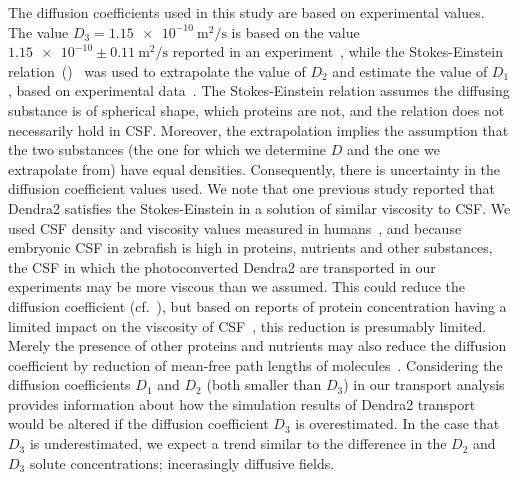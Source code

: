 \documentclass{WileyMSP-template}
\begin{document}
The diffusion coefficients used in this study are based on experimental values. 
The value $D_3=\num{1.15e-10} \ \mathrm{m^2/s}$
is based on the value $\num{1.15e-10} \pm 0.11 \ \mathrm{m^2/s}$ reported in an
experiment~\cite{GuraSadovsky2017MeasurementExpansion}, while the Stokes-Einstein
relation~()~\cite{Einstein1905UberTeilchen} was used to extrapolate
the value of $D_2$ and estimate the value of $D_1$, based on experimental
data~\cite{Swaminathan1997PhotobleachingDiffusion, Potma2001ReducedCells,
Mahmood2023ExosomeTemperature}. The Stokes-Einstein relation assumes the diffusing
substance is of spherical shape, which proteins are not, and the relation does not
necessarily hold in CSF. Moreover, the extrapolation implies the assumption that
the two substances (the one for which we determine $D$ and the one we extrapolate from)
have equal densities. Consequently, there is uncertainty in the diffusion coefficient values used.
We note that one previous study reported that
Dendra2 satisfies the Stokes-Einstein in a solution of similar viscosity
to CSF\cite{GuraSadovsky2017MeasurementExpansion}.
We used CSF density and viscosity values measured in
humans~\cite{Bloomfield1998EffectsFluid},
and because embryonic CSF in zebrafish is high in proteins, nutrients and other substances,
the CSF in which the photoconverted Dendra2 are transported in our experiments may be more viscous
than we assumed. This could reduce the diffusion coefficient (cf.~),
but based on reports of protein concentration having a limited impact on the viscosity of
CSF~\cite{Bloomfield1998EffectsFluid, Brydon1995PhysicalViscosity}, this reduction is presumably
limited. Merely the presence of other proteins and nutrients may also reduce the diffusion
coefficient by reduction of mean-free path lengths of molecules~\cite{Cussler2009Diffusion:Systems}.
Considering the diffusion coefficients $D_1$ and $D_2$ (both smaller
than $D_3$) in our transport analysis provides information about how the simulation
results of Dendra2 transport would be altered if the
diffusion coefficient $D_3$ is overestimated. In the case that $D_3$ is underestimated, 
we expect a trend similar to the difference in the $D_2$ and $D_3$ solute concentrations;
incerasingly diffusive fields.
\end{document}
